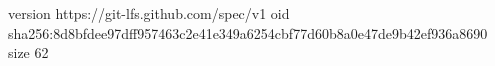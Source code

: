 version https://git-lfs.github.com/spec/v1
oid sha256:8d8bfdee97dff957463c2e41e349a6254cbf77d60b8a0e47de9b42ef936a8690
size 62
